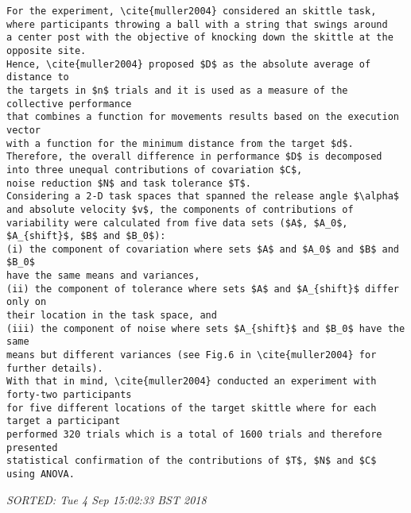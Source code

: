 \documentclass[10pt]{article}
\begin{document}
\begin{enumerate}[noitemsep,topsep=0pt]
\begin{verbatim}
For the experiment, \cite{muller2004} considered an skittle task, 
where participants throwing a ball with a string that swings around 
a center post with the objective of knocking down the skittle at the opposite site.
Hence, \cite{muller2004} proposed $D$ as the absolute average of distance to
the targets in $n$ trials and it is used as a measure of the collective performance 
that combines a function for movements results based on the execution vector 
with a function for the minimum distance from the target $d$.
Therefore, the overall difference in performance $D$ is decomposed
into three unequal contributions of covariation $C$, 
noise reduction $N$ and task tolerance $T$.
Considering a 2-D task spaces that spanned the release angle $\alpha$
and absolute velocity $v$, the components of contributions of
variability were calculated from five data sets ($A$, $A_0$, $A_{shift}$, $B$ and $B_0$):
(i) the component of covariation where sets $A$ and $A_0$ and $B$ and $B_0$ 
have the same means and variances,
(ii) the component of tolerance where sets $A$ and $A_{shift}$ differ only on
their location in the task space, and 
(iii) the component of noise where sets $A_{shift}$ and $B_0$ have the same
means but different variances (see Fig.6 in \cite{muller2004} for further details).
With that in mind, \cite{muller2004} conducted an experiment with forty-two participants 
for five different locations of the target skittle where for each target a participant 
performed 320 trials which is a total of 1600 trials and therefore presented 
statistical confirmation of the contributions of $T$, $N$ and $C$ using ANOVA.
\end{verbatim}
\textit{
SORTED:  Tue  4 Sep 15:02:33 BST 2018
}
\\







\end{enumerate}
\end{document}
